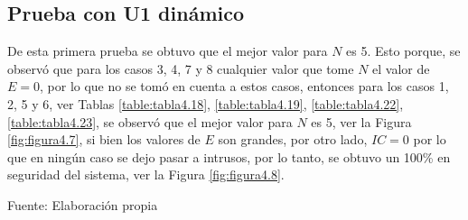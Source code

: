 \subsection{Prueba con U1 dinámico}
\par
De esta primera prueba se obtuvo que el mejor valor para $N$ es 5. Esto porque, se observó que para los casos 3, 4, 7 y 8 cualquier valor que tome $N$ el valor de $E = 0$, por lo que no se tomó en cuenta a estos casos, entonces para los casos 1, 2, 5 y 6, ver Tablas \ref{table:tabla4.18}, \ref{table:tabla4.19}, \ref{table:tabla4.22}, \ref{table:tabla4.23}, se observó que el mejor valor para $N$ es 5, ver la Figura \ref{fig:figura4.7}, si bien los valores de $E$ son grandes, por otro lado, $IC = 0$ por lo que en ningún caso se dejo pasar a intrusos, por lo tanto, se obtuvo un 100\% en seguridad del sistema, ver la Figura \ref{fig:figura4.8}.

\begin{center}
\begin{table}[H]
\centering
\caption{\small{Resultados para el caso 1 con U1 dinámico.}}
\label{table:tabla4.18}
\begin{center}
\vskip 0.2cm
{\small{Fuente: Elaboración propia}}
\end{center}
\end{table}
\end{center}

